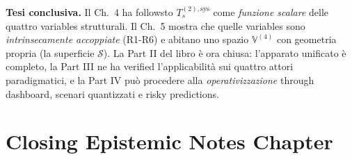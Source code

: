 \Hypoth{} \textbf{Tesi conclusiva.} Il Ch.~4 ha followsto
\(T_s^{(2),\text{sys}}\) come \emph{funzione scalare} delle quattro
variables strutturali. Il Ch.~5 mostra che quelle variables sono
\emph{intrinsecamente accoppiate} (R1-R6) e abitano uno spazio
\(\mathbb{V}^{(4)}\) con geometria propria (la superficie
\(\mathcal{S}\)). La Part II del libro è ora chiusa: l'apparato
unificato è completo, la Part III ne ha verified l'applicabilità sui
quattro attori paradigmatici, e la Part IV può procedere alla
\emph{operativizzazione} through dashboard, scenari quantizzati e
risky predictions.



\section{Closing Epistemic Notes
Chapter}\label{note-epistemiche-di-chiusura-chapter}

